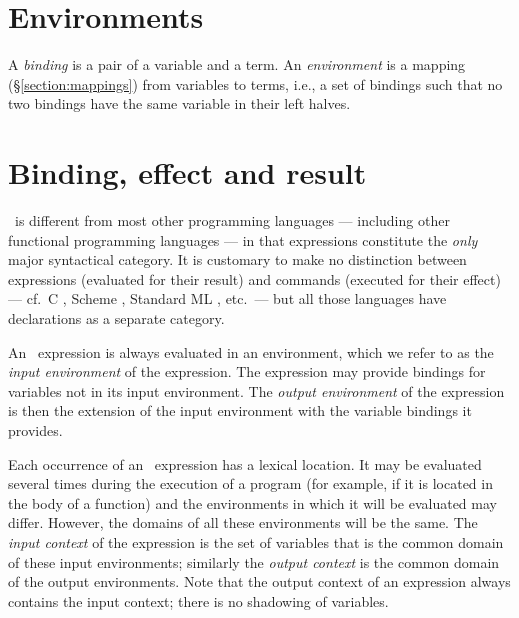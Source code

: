 \section{Environments}

\label{section:environments}
A \emph{binding} is a pair of a variable and a term.
An \emph{environment} is a mapping (\S\ref{section:mappings}) from
variables to terms, i.e., a set of bindings such that no two bindings
have the same variable in their left halves.

\section{Binding, effect and result}

\label{section:REB}

\Erlang\ is different from most other programming languages ---
including other functional programming languages --- in that
expressions constitute the \emph{only} major syntactical category.  It
is customary to make no distinction between expressions (evaluated for
their result) and commands (executed for their effect) --- cf.~C
\cite{iso-c}, Scheme \cite{scheme-r5rs}, Standard ML
\cite{milner+tofte+harper:revised-definition}, etc.\ --- but all those
languages have declarations as a separate category.

An \Erlang\ expression is always evaluated in an environment, which
we refer to as the \emph{input environment}
of the expression.  The
expression may provide bindings for variables not in
its input environment.  The \emph{output environment}
of the expression
is then the extension of the input environment with the variable bindings
it provides.

Each occurrence of an \Erlang\ expression has a lexical location.
It may be evaluated several times during the execution of
a program (for example, if it is located in the body of a function) and
the environments in which it will be evaluated may differ.  However,
the domains of all these environments will be the same.  The
\emph{input context} of the expression is the
set of variables that is the common domain of these input
environments; similarly the \emph{output context} is the common domain
of the output environments.  Note that the output context of an
expression always contains the input context; there is no shadowing
of variables.

